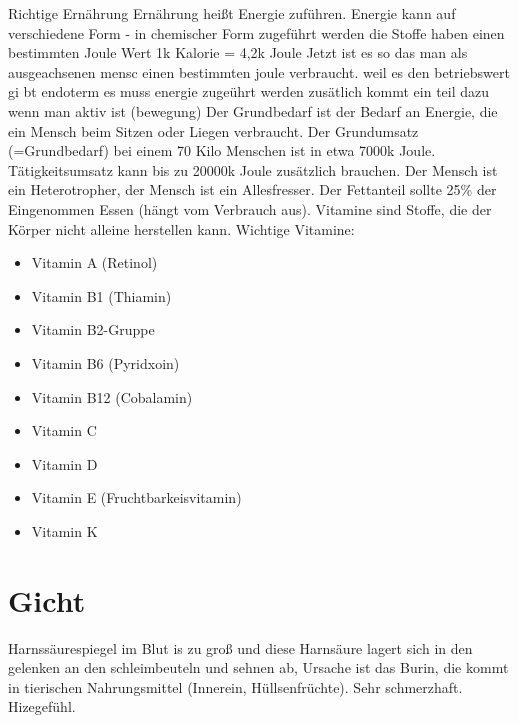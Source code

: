 \documentclass[a4paper]{article}
\begin{document}
Richtige Ernährung
\newline
\newline
Ernährung heißt Energie zuführen. 
Energie kann auf verschiedene Form - in chemischer Form zugeführt werden
die Stoffe haben einen bestimmten Joule Wert 1k Kalorie = 4,2k Joule
\newline
\newline
Jetzt ist es so das man als ausgeachsenen mensc einen bestimmten joule verbraucht. weil es den betriebswert gi bt endoterm es muss energie zugeührt werden zusätlich kommt ein teil dazu wenn man aktiv ist (bewegung) 
\newline
\newline
Der Grundbedarf ist der Bedarf an Energie, die ein Mensch beim Sitzen oder Liegen verbraucht. Der Grundumsatz (=Grundbedarf) bei einem 70 Kilo Menschen ist in etwa 7000k Joule. Tätigkeitsumsatz kann bis zu 20000k Joule zusätzlich brauchen.
\newline
\newline
Der Mensch ist ein Heterotropher, der Mensch ist ein Allesfresser. Der Fettanteil sollte 25\% der Eingenommen Essen (hängt vom Verbrauch aus). Vitamine sind Stoffe, die der Körper nicht alleine herstellen kann.
\newline
\newline
Wichtige Vitamine:

\begin{itemize}
\item Vitamin A (Retinol)
\item Vitamin B1 (Thiamin)
\item Vitamin B2-Gruppe 
\item Vitamin B6 (Pyridxoin)
\item Vitamin B12 (Cobalamin)
\item Vitamin C
\item Vitamin D
\item Vitamin E (Fruchtbarkeisvitamin)
\item Vitamin K
\end{itemize}

\section{Gicht}

Harnssäurespiegel im Blut is zu groß und diese Harnsäure lagert sich in den gelenken an den schleimbeuteln und sehnen ab, Ursache ist das Burin, die kommt in tierischen Nahrungsmittel (Innerein, Hüllsenfrüchte). Sehr schmerzhaft. Hizegefühl. 
\end{document}
